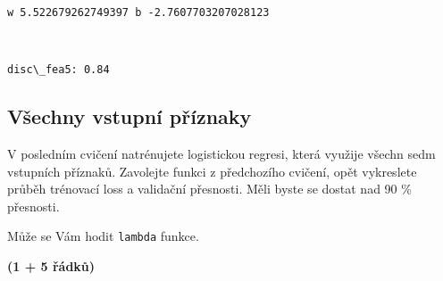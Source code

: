 \documentclass[11pt]{article}
\begin{document}
    \begin{Verbatim}[commandchars=\\\{\}]
w 5.522679262749397 b -2.7607703207028123
    \end{Verbatim}

    \begin{center}
    \end{center}
    { \hspace*{\fill} \\}
    
    \begin{Verbatim}[commandchars=\\\{\}]
disc\_fea5: 0.84
    \end{Verbatim}

    \subsection{Všechny vstupní
příznaky}\label{vux161echny-vstupnuxed-pux159uxedznaky}

V posledním cvičení natrénujete logistickou regresi, která využije
všechn sedm vstupních příznaků. Zavolejte funkci z předchozího cvičení,
opět vykreslete průběh trénovací loss a validační přesnosti. Měli byste
se dostat nad 90 \% přesnosti.

Může se Vám hodit \texttt{lambda} funkce.

\textbf{(1 + 5 řádků)}
\end{document}
